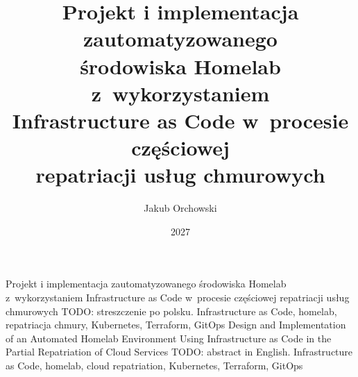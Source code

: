 \documentclass{SGGW-thesis}
\title{Projekt i implementacja zautomatyzowanego\\środowiska Homelab z~wykorzystaniem\\Infrastructure as Code w~procesie częściowej\\repatriacji usług chmurowych}
\author{Jakub Orchowski}
\date{2027}
\begin{document}
\maketitle
\statementpage
\abstractpage
{Projekt i implementacja zautomatyzowanego środowiska Homelab z~wykorzystaniem Infrastructure as Code w~procesie częściowej repatriacji usług chmurowych}
{TODO: streszczenie po polsku.}
{Infrastructure as Code, homelab, repatriacja chmury, Kubernetes, Terraform, GitOps}
{Design and Implementation of an Automated Homelab Environment Using Infrastructure as Code in the Partial Repatriation of Cloud Services}
{TODO: abstract in English.}
{Infrastructure as Code, homelab, cloud repatriation, Kubernetes, Terraform, GitOps}
\tableofcontents













\beforelastpage
\end{document}
